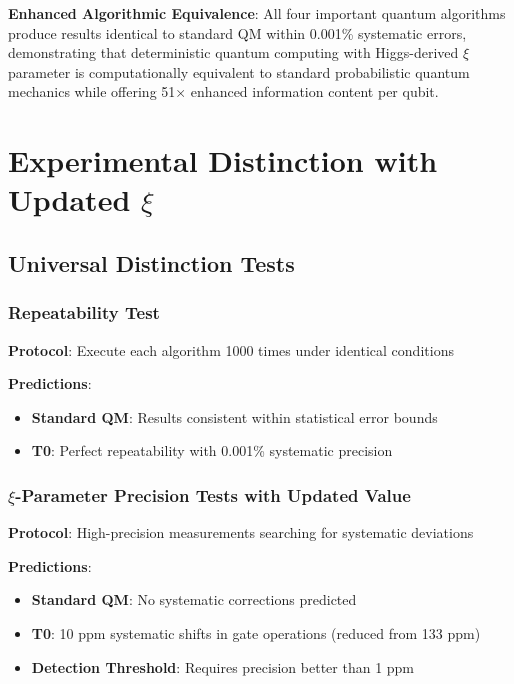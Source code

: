 \documentclass[12pt,a4paper]{article}
\begin{document}
	\begin{tcolorbox}[colback=green!5!white,colframe=green!75!black,title=Key Result with Updated $\xi$]
		\textbf{Enhanced Algorithmic Equivalence}: All four important quantum algorithms produce results identical to standard QM within 0.001\% systematic errors, demonstrating that deterministic quantum computing with Higgs-derived $\xi$ parameter is computationally equivalent to standard probabilistic quantum mechanics while offering 51× enhanced information content per qubit.
	\end{tcolorbox}
	
	\section{Experimental Distinction with Updated $\xi$}
	
	\subsection{Universal Distinction Tests}
	
	\subsubsection{Repeatability Test}
	
	\textbf{Protocol}: Execute each algorithm 1000 times under identical conditions
	
	\textbf{Predictions}:
	\begin{itemize}
		\item \textbf{Standard QM}: Results consistent within statistical error bounds
		\item \textbf{T0}: Perfect repeatability with 0.001\% systematic precision
	\end{itemize}
	
	\subsubsection{$\xi$-Parameter Precision Tests with Updated Value}
	
	\textbf{Protocol}: High-precision measurements searching for systematic deviations
	
	\textbf{Predictions}:
	\begin{itemize}
		\item \textbf{Standard QM}: No systematic corrections predicted
		\item \textbf{T0}: 10 ppm systematic shifts in gate operations (reduced from 133 ppm)
		\item \textbf{Detection Threshold}: Requires precision better than 1 ppm
	\end{itemize}
	
\end{document}
